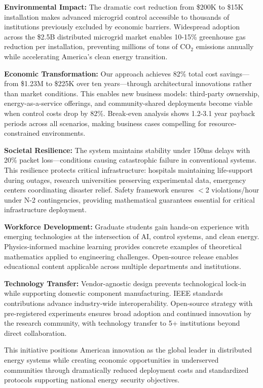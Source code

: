 \documentclass[12pt]{article}
\begin{document}
\textbf{Environmental Impact:} The dramatic cost reduction from \$200K to \$15K installation makes advanced microgrid control accessible to thousands of institutions previously excluded by economic barriers. Widespread adoption across the \$2.5B distributed microgrid market enables 10-15\% greenhouse gas reduction per installation, preventing millions of tons of CO$_2$ emissions annually while accelerating America's clean energy transition.

\textbf{Economic Transformation:} Our approach achieves 82\% total cost savings—from \$1.23M to \$225K over ten years—through architectural innovations rather than market conditions. This enables new business models: third-party ownership, energy-as-a-service offerings, and community-shared deployments become viable when control costs drop by 82\%. Break-even analysis shows 1.2-3.1 year payback periods across all scenarios, making business cases compelling for resource-constrained environments.

\textbf{Societal Resilience:} The system maintains stability under 150ms delays with 20\% packet loss—conditions causing catastrophic failure in conventional systems. This resilience protects critical infrastructure: hospitals maintaining life-support during outages, research universities preserving experimental data, emergency centers coordinating disaster relief. Safety framework ensures $<$2 violations/hour under N-2 contingencies, providing mathematical guarantees essential for critical infrastructure deployment.

\textbf{Workforce Development:} Graduate students gain hands-on experience with emerging technologies at the intersection of AI, control systems, and clean energy. Physics-informed machine learning provides concrete examples of theoretical mathematics applied to engineering challenges. Open-source release enables educational content applicable across multiple departments and institutions.

\textbf{Technology Transfer:} Vendor-agnostic design prevents technological lock-in while supporting domestic component manufacturing. IEEE standards contributions advance industry-wide interoperability. Open-source strategy with pre-registered experiments ensures broad adoption and continued innovation by the research community, with technology transfer to 5+ institutions beyond direct collaboration.

This initiative positions American innovation as the global leader in distributed energy systems while creating economic opportunities in underserved communities through dramatically reduced deployment costs and standardized protocols supporting national energy security objectives.
\end{document}

